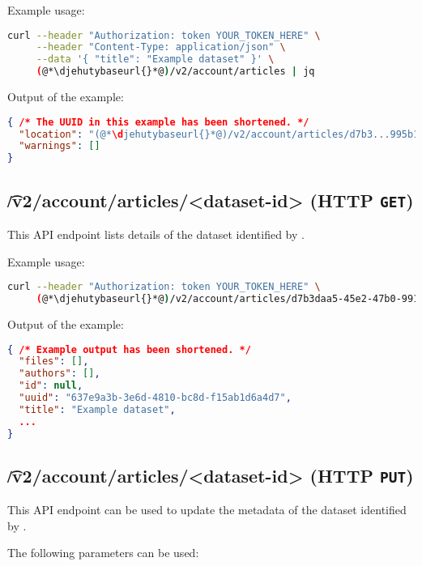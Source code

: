   Example usage:
\begin{lstlisting}[language=bash]
curl --header "Authorization: token YOUR_TOKEN_HERE" \
     --header "Content-Type: application/json" \
     --data '{ "title": "Example dataset" }' \
     (@*\djehutybaseurl{}*@)/v2/account/articles | jq
\end{lstlisting}

  Output of the example:
\begin{lstlisting}[language=JSON]
{ /* The UUID in this example has been shortened. */
  "location": "(@*\djehutybaseurl{}*@)/v2/account/articles/d7b3...995b1",
  "warnings": []
}
\end{lstlisting}

\subsection{\t{/v2/account/articles/<dataset-id>} (HTTP \texttt{GET})}

  This API endpoint lists details of the dataset identified by .

  Example usage:
\begin{lstlisting}[language=bash]
curl --header "Authorization: token YOUR_TOKEN_HERE" \
     (@*\djehutybaseurl{}*@)/v2/account/articles/d7b3daa5-45e2-47b0-9910-0f7fa6a995b1 | jq
\end{lstlisting}

  Output of the example:
\begin{lstlisting}[language=JSON]
{ /* Example output has been shortened. */
  "files": [],
  "authors": [],
  "id": null,
  "uuid": "637e9a3b-3e6d-4810-bc8d-f15ab1d6a4d7",
  "title": "Example dataset",
  ...
}
\end{lstlisting}

\subsection{\t{/v2/account/articles/<dataset-id>} (HTTP \texttt{PUT})}

  This API endpoint can be used to update the metadata of the dataset
  identified by .

  The following parameters can be used:

